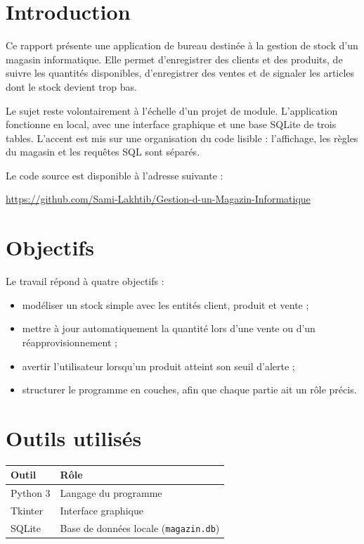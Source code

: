 \documentclass[11pt,a4paper]{article}
\newcommand{\repo}{\url{https://github.com/Sami-Lakhtib/Gestion-d-un-Magazin-Informatique}}
\begin{document}
\tableofcontents
\newpage

\section{Introduction}

Ce rapport présente une application de bureau destinée à la gestion de stock d'un magasin informatique. Elle permet d'enregistrer des clients et des produits, de suivre les quantités disponibles, d'enregistrer des ventes et de signaler les articles dont le stock devient trop bas.

Le sujet reste volontairement à l'échelle d'un projet de module. L'application fonctionne en local, avec une interface graphique et une base SQLite de trois tables. L'accent est mis sur une organisation du code lisible : l'affichage, les règles du magasin et les requêtes SQL sont séparés.

Le code source est disponible à l'adresse suivante :

\begin{center}
\repo
\end{center}

\section{Objectifs}

Le travail répond à quatre objectifs :

\begin{itemize}
    \item modéliser un stock simple avec les entités client, produit et vente ;
    \item mettre à jour automatiquement la quantité lors d'une vente ou d'un réapprovisionnement ;
    \item avertir l'utilisateur lorsqu'un produit atteint son seuil d'alerte ;
    \item structurer le programme en couches, afin que chaque partie ait un rôle précis.
\end{itemize}

\section{Outils utilisés}

\begin{center}
\begin{tabular}{@{}ll@{}}
\toprule
\textbf{Outil} & \textbf{Rôle} \\
\midrule
Python 3 & Langage du programme \\
Tkinter & Interface graphique \\
SQLite & Base de données locale (\texttt{magazin.db}) \\
\bottomrule
\end{tabular}
\end{center}
\end{document}
